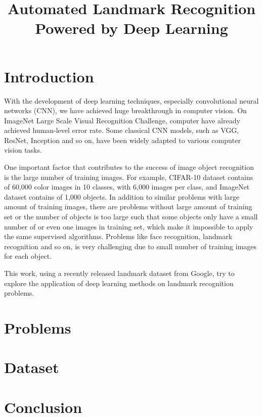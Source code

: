 \documentclass{article}
\title{Automated Landmark Recognition Powered by Deep Learning}
\begin{document}
%
\maketitle

\section{Introduction}
\label{sec:intro}
With the development of deep learning techniques, especially convolutional neural networks (CNN), we have achieved huge breakthrough in computer vision. On ImageNet Large Scale Visual Recognition Challenge, computer have already achieved human-level error rate. Some classical CNN models, such as VGG, ResNet, Inception and so on, have been widely adapted to various computer vision tasks. 

One important factor that contributes to the success of image object recognition is the large number of training images. For example, CIFAR-10 dataset contains of 60,000 color images in 10 classes, with 6,000 images per class, and ImageNet dataset contains of 1,000 objects. In addition to similar problems with large amount of training images, there are problems without large amount of training set or the number of objects is too large such that some objects only have a small number of or even one images in training set, which make it impossible to apply the same supervised algorithms. Problems like face recognition, landmark recognition and so on, is very challenging due to small number of training images for each object.

This work, using a recently released landmark dataset from Google, try to explore the application of deep learning methods on landmark recognition problems.

\section{Problems}
\label{sec:problem}



\section{Dataset}
\label{sec:dataset}



\section{Conclusion}
\label{sec:conclusion}



\vfill\pagebreak


%

\end{document}
